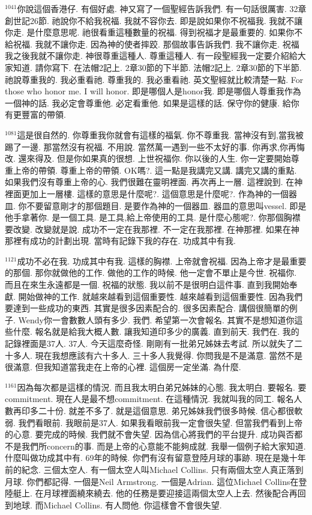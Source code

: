 \documentclass{book}
\begin{document}
$^{1041}$你說這個香港仔.
有個好處.
神又寫了一個聖經告訴我們.
有一句話很厲害.
32章創世記26節.
祂說你不給我祝福.
我就不容你去.
即是說如果你不祝福我.
我就不讓你走.
是什麼意思呢.
祂很看重這種數量的祝福.
得到祝福才是最重要的.
如果你不給祝福.
我就不讓你走.
因為神的使者摔跤.
那個故事告訴我們.
我不讓你走.
祝福我之後我就不讓你走.
神很尊重這種人.
尊重這種人.
有一段聖經我一定要介紹給大家知道.
請你寫下.
在法帽2記上.
2章30節的下半節.
法帽2記上.
2章30節的下半節.
祂說尊重我的.
我必重看祂.
尊重我的.
我必重看祂.
英文聖經就比較清楚一點.
For those who honor me.
I will honor.
即是哪個人是honor我.
即是哪個人尊重我作為一個神的話.
我必定會尊重他.
必定看重他.
如果是這樣的話.
保守你的健康.
給你有更豐富的帶領.

$^{1081}$這是很自然的.
你尊重我你就會有這樣的福氣.
你不尊重我.
當神沒有到,當我被踢了一邊.
那當然沒有祝福.
不用說.
當然萬一遇到一些不太好的事.
你再求,你再悔改.
還來得及.
但是你如果真的很想.
上世祝福你.
你以後的人生.
你一定要開始尊重上帝的帶領.
尊重上帝的帶領.
OK嗎?.
這一點是我講完又講.
講完又講的重點.
如果我們沒有尊重上帝的心.
我們很難在靈明裡面.
再次再上一層.
這裡說到.
在神裡面更加上一層樓.
這樣的意思是什麼呢?.
這個意思是什麼呢?.
作為神的一個器皿.
你不要留意剛才的那個題目.
是要作為神的一個器皿.
器皿的意思叫vessel.
即是他手拿著你.
是一個工具.
是工具,給上帝使用的工具.
是什麼心態呢?.
你那個胸襟要改變.
改變就是說.
成功不一定在我那裡.
不一定在我那裡.
在神那裡.
如果在神那裡有成功的計劃出現.
當時有記錄下我的存在.
功成其中有我.

$^{1121}$成功不必在我.
功成其中有我.
這樣的胸襟.
上帝就會祝福.
因為上帝才是最重要的那個.
那你就做他的工作.
做他的工作的時候.
他一定會不單止是今世.
祝福你.
而且在來生永遠都是一個.
祝福的狀態.
我以前不是很明白這件事.
直到我開始奉獻.
開始做神的工作.
就越來越看到這個重要性.
越來越看到這個重要性.
因為我們要達到一些成功的東西.
其實是很多因素配合的.
很多因素配合.
講個很簡單的例子.
Wendy你一會數數人頭有多少.
我們.
希望第一次會報名.
其實不是想知道你這些什麼.
報名就是給我大概人數.
讓我知道印多少的廣義.
直到前天.
我們在.
我的記錄裡面是37人.
37人.
今天這麼奇怪.
剛剛有一批弟兄姊妹去考試.
所以就失了二十多人.
現在我想應該有六十多人.
三十多人我覺得.
你問我是不是滿意.
當然不是很滿意.
但我知道當我走在上帝的心裡.
這個房一定坐滿.
為什麼.

$^{1161}$因為每次都是這樣的情況.
而且我太明白弟兄姊妹的心態.
我太明白.
要報名.
要commitment.
現在人是最不想commitment.
在這種情況.
我就叫我的同工.
報名人數再印多二十份.
就差不多了.
就是這個意思.
弟兄姊妹我們很多時候.
信心都很軟弱.
我們看眼前.
我眼前是37人.
如果我看眼前我一定會很失望.
但當我們看到上帝的心意.
要完成的時候.
我們就不會失望.
因為信心將我們的平台提升.
成功與否都不是我們所concern的事.
而是上帝的心意能不能夠成就.
我舉一個例子給大家知道.
什麼叫做功成其中有.
69年的時候.
你們有沒有留意登陸月球的事跡.
現在是幾十年前的紀念.
三個太空人.
有一個太空人叫Michael Collins.
只有兩個太空人真正落到月球.
你們都記得.
一個是Neil Armstrong.
一個是Adrian.
這位Michael Collins在登陸艇上.
在月球裡面繞來繞去.
他的任務是要迎接這兩個太空人上去.
然後配合再回到地球.
而Michael Collins.
有人問他.
你這樣會不會很失望.
\end{document}
